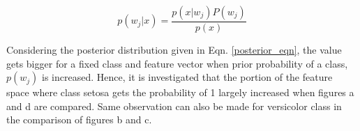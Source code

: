 \documentclass[11pt]{extarticle}
\begin{document}
\begin{equation}
    p(w_j|x) = \frac{p(x|w_j)P(w_j)}{p(x)}
    \label{posterior_eqn}
\end{equation}

Considering the posterior distribution given in Eqn. \ref{posterior_eqn}, the value gets bigger for a fixed class and feature vector
when prior probability of a class, $p(w_j)$ is increased. Hence, it is investigated that the portion of the feature space where class
setosa gets the probability of 1 largely increased when figures a and d are compared. Same observation can also be made for 
versicolor class in the comparison of figures b and c.
\end{document}

